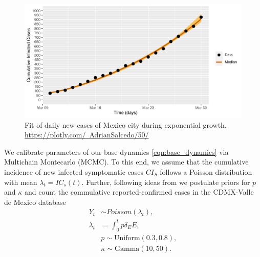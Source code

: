 \begin{figure}[htb]
    \centering
    \includegraphics[scale=0.7, keepaspectratio]{./cdmx_CIs_data_begining_fit}
    \caption{%
        Fit of daily new cases of Mexico city
        during exponential growth.
        \href{https://plotly.com/~AdrianSalcedo/50/}{%
		 https://plotly.com/~AdrianSalcedo/50/}
    }
    \label{fig:data_CDMX_fitting}
\end{figure}
%
We calibrate parameters of our base dynamics
\eqref{eqn:base_dynamics} via Multichain Montecarlo (MCMC).
To this end, we assume that the cumulative
incidence of new infected symptomatic cases $CI_S$
follows a Poisson distribution with mean $\lambda_t = IC_s(t)$. Further,
following ideas from \cite{Acuna2020} we postulate priors for $p$ and $\kappa$
and count the commulative reported-confirmed cases in the CDMX-Valle de Mexico
database \cite{DataMX}
\begin{equation}
    \label{eqn:boservation_model}
    \begin{aligned}
        Y_t & \sim Poisson(\lambda_t),
        \\
        \lambda_t
        &=
        \int_{0}^t p \delta_E E ,
        \\
        & p \sim \text{Uniform} (0.3, 0.8),
        \\
        & \kappa \sim \text{Gamma}(10, 50).
    \end{aligned}
\end{equation}

